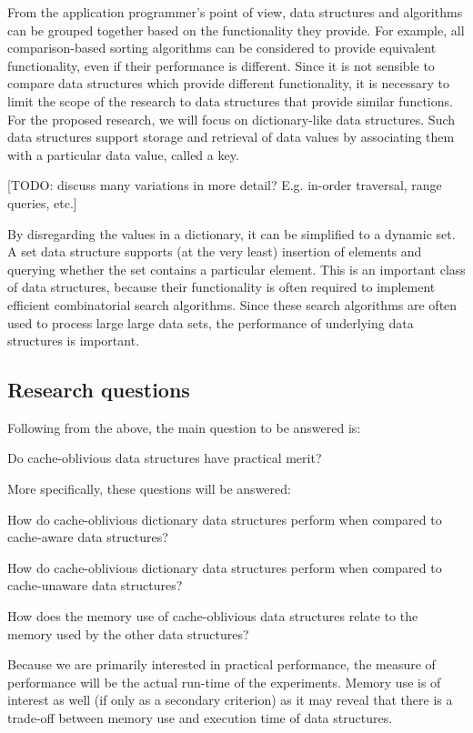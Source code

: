 \documentclass{acm_proc_article-sp}
\begin{document}
From the application programmer's point of view, data structures and algorithms can be grouped together based on the functionality they provide. For example, all comparison-based sorting algorithms can be considered to provide equivalent functionality, even if their performance is different. Since it is not sensible to compare data structures which provide different functionality, it is necessary to limit the scope of the research to data structures that provide similar functions. For the proposed research, we will focus on dictionary-like data structures. Such data structures support storage and retrieval of data values by associating them with a particular data value, called a key.

[TODO: discuss many variations in more detail? E.g. in-order traversal, range queries, etc.]

By disregarding the values in a dictionary, it can be simplified to a dynamic set. A set data structure supports (at the very least) insertion of elements and querying whether the set contains a particular element. This is an important class of data structures, because their functionality is often required to implement efficient combinatorial search algorithms. Since these search algorithms are often used to process large large data sets, the performance of underlying data structures is important.

\subsection{Research questions}
Following from the above, the main question to be answered is:
\begin{list}{}{}
\item Do cache-oblivious data structures have practical merit?
\end{list}

More specifically, these questions will be answered:
\begin{list}{.}{}
\item How do cache-oblivious dictionary data structures perform when compared to cache-aware data structures?
\item How do cache-oblivious dictionary data structures perform when compared to cache-unaware data structures?
\item How does the memory use of cache-oblivious data structures relate to the memory used by the other data structures?
\end{list}
Because we are primarily interested in practical performance, the measure of performance will be the actual run-time of the experiments. Memory use is of interest as well (if only as a secondary criterion) as it may reveal that there is a trade-off between memory use and execution time of data structures.
\end{document}
